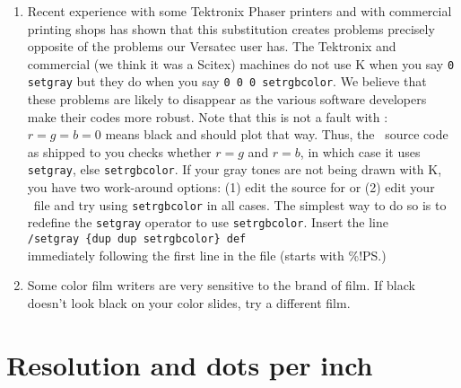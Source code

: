 \begin{enumerate}
\item Recent experience with some Tektronix Phaser printers and
with commercial printing shops has shown that this substitution
creates problems precisely opposite of the problems our Versatec
user has.  The Tektronix and commercial (we think it was a Scitex)
machines do not use K when you say \texttt{0 setgray} but they do when
you say \texttt{0 0 0 setrgbcolor}.  We believe that these problems are
likely to disappear as the various software developers make their
codes more robust.  Note that this is not a fault with \GMT:
$r = g = b = 0$ means black and should plot that way.
Thus, the \GMT\ source code as shipped to you checks whether $r=g$
and $r=b$, in which case it uses \texttt{setgray}, else \texttt{setrgbcolor}.
If your gray tones are not being drawn with K, you have two
work-around options: (1) edit the source for 
or (2) edit your \PS\ file and try using \texttt{setrgbcolor}
in all cases.  The simplest way to do so is to redefine the
\texttt{setgray} operator to use \texttt{setrgbcolor}.
Insert the line \\

\indent \texttt{/setgray  \{dup dup setrgbcolor\} def} \\

immediately following the first line in the file (starts with
\%!PS.) 

\item Some color film writers are very sensitive to the brand
of film.  If black doesn't look black on your color slides, try
a different film.

\end{enumerate}

\section{Resolution and dots per inch}

